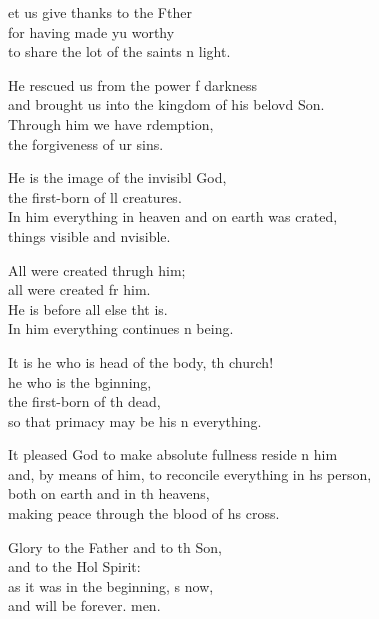 \settowidth{\versewidth}{and, by means of him, to reconcile everything in his person,}
\begin{psalmverse}%
  \begin{patverse}
et us give thanks to the Fther\Flex\\
for having made yu worthy\Med\\
to share the lot of the saints \pointup{\i}n light.

He rescued us from the power f darkness\Med\\
and brought us into the kingdom of his belovd Son.\\
Through him we have rdemption,\Med\\
the forgiveness of ur sins.

He is the image of the invisibl God,\Med\\
the first-born of ll creatures.\\
In him everything in heaven and on earth was crated,\Med\\
things visible and \pointup{\i}nvisible.

All were created thrugh him;\Med\\
all were created fr him.\\
He is before all else tht is.\Med\\
In him everything continues \pointup{\i}n being.

It is he who is head of the body, th church!\Med\\
he who is the bginning,\\
the first-born of th dead,\Med\\
so that primacy may be his \pointup{\i}n everything.

It pleased God to make absolute fullness reside \pointup{\i}n him\Med\\
and, by means of him, to reconcile everything in h\pointup{\i}s person,\\
both on earth and in th heavens,\Med\\
making peace through the blood of h\pointup{\i}s cross.

Glory to the Father and to th Son,\Med\\
and to the Hol Spirit:\\
as it was in the beginning, \pointup{\i}s now,\Med\\
and will be forever. men. 
  \end{patverse}
\end{psalmverse}
